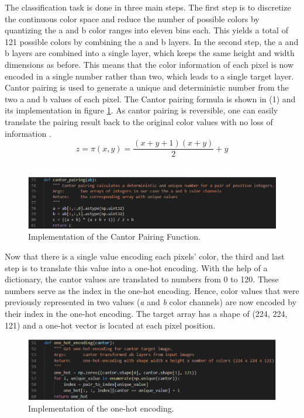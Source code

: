 \documentclass[12pt,letterpaper]{article}
\begin{document}
The classification task is done in three main steps. The first step is to discretize the continuous color space and reduce the number of possible colors by quantizing the a and b color ranges into eleven bins each. This yields a total of 121 possible colors by combining the a and b layers. In the second step, the a and b layers are combined into a single layer, which keeps the same height and width dimensions as before. This means that the color information of each pixel is now encoded in a single number rather than two, which leads to a single target layer. Cantor pairing is used to generate a unique and deterministic number from the two a and b values of each pixel. The Cantor pairing formula is shown in (1) and its implementation in figure \ref{cantorpairing}. As cantor pairing is reversible, one can easily translate the pairing result back to the original color values with no loss of information \citep{cantor2007}.\\
\begin{equation}
z = \pi(x,y) = \frac{(x+y+1)(x+y)}{2}+y
\end{equation}\\
\begin{figure}[h]
	\centering
	\includegraphics[width=1.0\textwidth]{code_cantor_pairing.png}
	\caption{Implementation of the Cantor Pairing Function.}
	\label{cantorpairing}
\end{figure}
Now that there is a single value encoding each pixels’ color, the third and last step is to translate this value into a one-hot encoding. With the help of a dictionary, the cantor values are translated to numbers from 0 to 120. These numbers serve as the index in the one-hot encoding. Hence, color values that were previously represented in two values (\emph{a} and \emph{b} color channels) are now encoded by their index in the one-hot encoding. The target array has a shape of (224, 224, 121) and a one-hot vector is located at each pixel position.
\begin{figure}[htb]
	\centering
	\includegraphics[width=1.0\textwidth]{code_onehot.png}
	\caption{Implementation of the one-hot encoding.}
	\label{onehot}
\end{figure}
\end{document}
